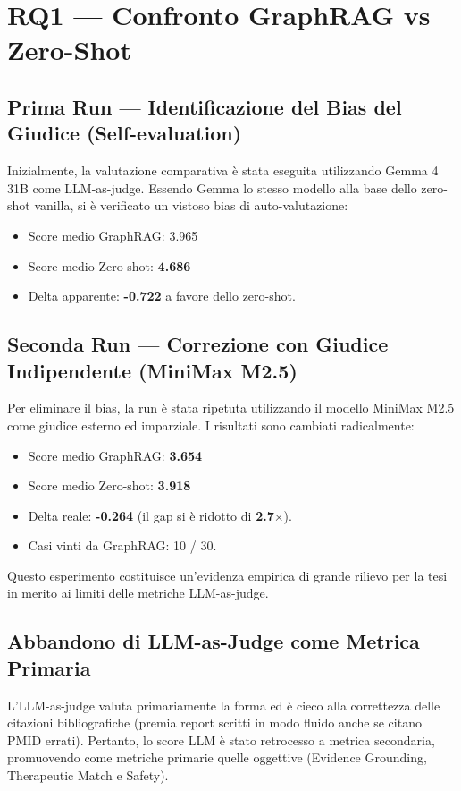 \documentclass[12pt, a4paper]{article}
\begin{document}
\section{RQ1 --- Confronto GraphRAG vs Zero-Shot}

\subsection{Prima Run --- Identificazione del Bias del Giudice (Self-evaluation)}
Inizialmente, la valutazione comparativa è stata eseguita utilizzando Gemma 4 31B come LLM-as-judge. Essendo Gemma lo stesso modello alla base dello zero-shot vanilla, si è verificato un vistoso bias di auto-valutazione:
\begin{itemize}[leftmargin=1.6em, itemsep=2pt]
  \item Score medio GraphRAG: 3.965
  \item Score medio Zero-shot: \textbf{4.686}
  \item Delta apparente: \textbf{-0.722} a favore dello zero-shot.
\end{itemize}

\subsection{Seconda Run --- Correzione con Giudice Indipendente (MiniMax M2.5)}
Per eliminare il bias, la run è stata ripetuta utilizzando il modello MiniMax M2.5 come giudice esterno ed imparziale. I risultati sono cambiati radicalmente:
\begin{itemize}[leftmargin=1.6em, itemsep=2pt]
  \item Score medio GraphRAG: \textbf{3.654}
  \item Score medio Zero-shot: \textbf{3.918}
  \item Delta reale: \textbf{-0.264} (il gap si è ridotto di \textbf{2.7$\times$}).
  \item Casi vinti da GraphRAG: 10 / 30.
\end{itemize}
Questo esperimento costituisce un'evidenza empirica di grande rilievo per la tesi in merito ai limiti delle metriche LLM-as-judge.

\subsection{Abbandono di LLM-as-Judge come Metrica Primaria}
L'LLM-as-judge valuta primariamente la forma ed è cieco alla correttezza delle citazioni bibliografiche (premia report scritti in modo fluido anche se citano PMID errati). Pertanto, lo score LLM è stato retrocesso a metrica secondaria, promuovendo come metriche primarie quelle oggettive (Evidence Grounding, Therapeutic Match e Safety).
\end{document}
